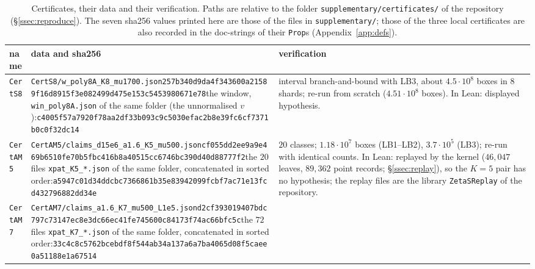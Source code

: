 \begin{table}[ht]\centering\small
\caption{Certificates, their data and their verification. Paths are relative to the folder
\texttt{supplementary/certificates/} of the repository (\S\ref{ssec:reproduce}). The seven sha256 values printed here are those of the
files in \texttt{supplementary/}; those of the three local certificates are also recorded in the doc-strings of their \texttt{Prop}s
(Appendix~\ref{app:defs}).}\label{tab:certs}
\footnotesize
\begin{tabular}{@{}p{1.3cm}>{\raggedright\arraybackslash}p{7.9cm}>{\raggedright\arraybackslash}p{5.8cm}@{}}
\toprule
name & data and sha256 & verification\\
\midrule
\texttt{CertS8} & \texttt{CertS8/\allowbreak w\_poly8A\_K8\_mu1700.json}\newline \texttt{257b340d9da4f343600a21589f16d891}\newline\texttt{5f3e082499d475e153c5453980671e78}\newline the window, \texttt{win\_poly8A.json} of the same folder (the unnormalised $v$):\newline \texttt{c4005f57a7920f78aa2df33b093c9c50}\newline\texttt{30efac2b8e39fc6cf7371b0c0f32dc14} &
interval branch-and-bound with LB3, about $4.5\cdot10^8$ boxes in $8$ shards; re-run from scratch ($4.51\cdot10^8$ boxes). In Lean: displayed hypothesis.\\[4pt]
\texttt{CertAM5} & \texttt{CertAM5/\allowbreak claims\_d15e6\_a1.6\_K5\_mu500.json}\newline \texttt{cf055dd2ee9a9e469b6510fe70b5fbc4}\newline\texttt{16b8a40515cc6746bc390d40d88777f2}\newline the $20$ files \texttt{xpat\_K5\_*.json} of the same folder, concatenated in sorted order:\newline \texttt{a5947c01d34ddcbc7366861b35e83942}\newline\texttt{099fcbf7ac71e13fcd432796882dd34e} &
$20$ classes; $1.18\cdot10^7$ boxes (LB1--LB2), $3.7\cdot10^5$ (LB3); re-run with identical counts. In Lean: replayed by the kernel ($46{,}047$ leaves, $89{,}362$ point records; \S\ref{ssec:replay}), so the $K=5$ pair has no hypothesis; the replay files are the library \texttt{ZetaSReplay} of the repository.\\[4pt]
\texttt{CertAM7} & \texttt{CertAM7/\allowbreak claims\_a1.6\_K7\_mu500\_L1e5.json}\newline \texttt{d2cf393019407bdc797c73147ec8e3dc}\newline\texttt{66ec41fe745600c84173f74ac66bfc5c}\newline the $72$ files \texttt{xpat\_K7\_*.json} of the same folder, concatenated in sorted order:\newline \texttt{33c4c8c5762bcebdf8f544ab34a137a6}\newline\texttt{a7ba4065d08f5caee0a51188e1a67514} &

\end{tabular}
\end{table}

